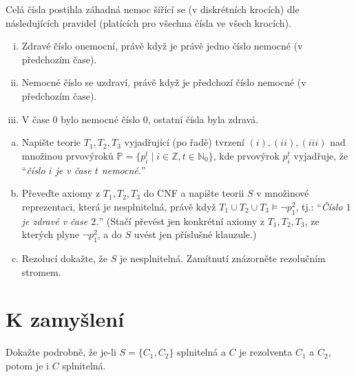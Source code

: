 \begin{problem}

    Celá čísla postihla záhadná nemoc šířící se (v diskrétních krocích) dle následujících pravidel (platících pro všechna čísla ve všech krocích).
    \begin{enumerate}[(i)]\it
        \item Zdravé číslo onemocní, právě když je právě jedno číslo nemocné (v předchozím čase).
        \item Nemocné číslo se uzdraví, právě když je předchozí číslo nemocné (v předchozím čase).
        \item V čase $0$ bylo nemocné číslo $0$, ostatní čísla byla zdravá.
    \end{enumerate}
    \begin{enumerate}[(a)]
        \item Napište teorie $T_1, T_2, T_3$ vyjadřující (po řadě) tvrzení $(i), (ii), (iii)$ nad množinou prvovýroků $\mathbb{P}=\{p_i^t \mid i\in\mathbb{Z}, t\in\mathbb{N}_0\}$, kde prvovýrok $p_i^t$ vyjadřuje, že ``{\it číslo $i$ je v čase $t$ nemocné.}''
        \item Převeďte axiomy z $T_1, T_2, T_3$ do CNF a napište teorii $S$ v množinové reprezentaci, která je nesplnitelná, právě když $T_1 \cup T_2 \cup T_3 \models \neg p_1^2$, tj.: ``{\it Číslo $1$ je zdravé v čase $2$.}'' (Stačí převést jen konkrétní axiomy z $T_1,T_2,T_3$, ze kterých plyne $\neg p_1^2$, a do $S$ uvést jen příslušné klauzule.)
        \item Rezolucí dokažte, že $S$ je nesplnitelná. Zamítnutí znázorněte rezolučním stromem.
    \end{enumerate}

\end{problem}

        
\section*{K zamyšlení}


\begin{problem}
    Dokažte podrobně, že je-li $S=\{C_1,C_2\}$ splnitelná a $C$ je rezolventa $C_1$ a $C_2$, potom je i $C$ splnitelná.
\end{problem}

